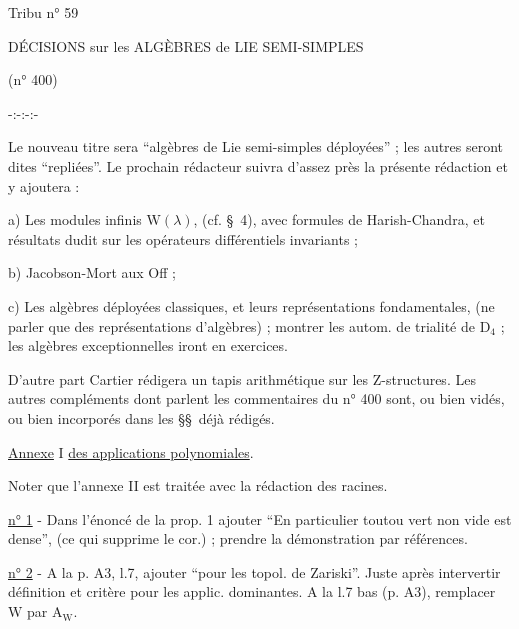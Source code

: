 Tribu n° 59

DÉCISIONS sur les ALGÈBRES de LIE SEMI-SIMPLES

(n° 400)

-:-:-:-

Le nouveau titre sera ``algèbres de Lie semi-simples déployées'' ; les autres seront dites ``repliées''. Le prochain rédacteur suivra d'assez près la présente rédaction et y ajoutera :

a) Les modules infinis $\mathrm{W}(\lambda)$, (cf. \S\ 4), avec formules de Harish-Chandra, et résultats dudit sur les opérateurs différentiels invariants ;

b) Jacobson-Mort aux Off ;

c) Les algèbres déployées classiques, et leurs représentations fondamentales, (ne parler que des représentations d'algèbres) ; montrer les autom. de trialité de $\mathrm{D}_4$ ; les algèbres exceptionnelles iront en exercices.

D'autre part Cartier rédigera un tapis arithmétique sur les $\mathrm{Z}$-structures. Les autres compléments dont parlent les commentaires du n° 400 sont, ou bien vidés, ou bien incorporés dans les \S\S\ déjà rédigés.

\uline{Annexe} I \uline{des applications polynomiales}.

Noter que l'annexe II est traitée avec la rédaction des racines.

\uline{n° 1} - Dans l'énoncé de la prop. 1 ajouter ``En particulier toutou vert non vide est dense'', (ce qui supprime le cor.) ; prendre la démonstration par références.

\uline{n° 2} - A la p. A3, l.7, ajouter ``pour les topol. de Zariski''. Juste après intervertir définition et critère pour les applic. dominantes. A la l.7 bas (p. A3), remplacer $\mathrm{W}$ par $\mathrm{A}_{\mathrm W}$.

